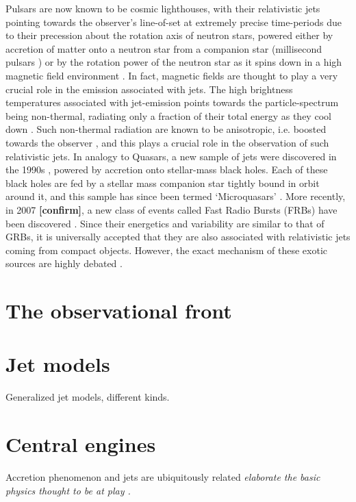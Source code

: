 Pulsars are now known to be cosmic lighthouses, with their relativistic jets pointing towards the observer's line-of-set at extremely precise time-periods due to their precession about the rotation axis of neutron stars, powered either by accretion of matter onto a neutron star from a companion star (millisecond pulsars \R) or by the rotation power of the neutron star as it spins down in a high magnetic field environment \R. In fact, magnetic fields are thought to play a very crucial role in the emission associated with jets. The high brightness temperatures associated with jet-emission points towards the particle-spectrum being non-thermal, radiating only a fraction of their total energy as they cool down \R. Such non-thermal radiation are known to be anisotropic, i.e. boosted towards the observer \Rlots, and this plays a crucial role in the observation of such relativistic jets. In analogy to Quasars, a new sample of jets were discovered in the 1990s \Rlots, powered by accretion onto stellar-mass black holes. Each of these black holes are fed by a stellar mass companion star tightly bound in orbit around it, and this sample has since been termed `Microquasars' \R. More recently, in 2007 \textbf{[confirm]}, a new class of events called Fast Radio Bursts (FRBs) have been discovered \R. Since their energetics and variability are similar to that of GRBs, it is universally accepted that they are also associated with relativistic jets coming from compact objects. However, the exact mechanism of these exotic sources are highly debated \Rlots.

\section{The observational front}

\section{Jet models}
Generalized jet models, different kinds.

\section{Central engines}
Accretion phenomenon and jets are ubiquitously related \emph{elaborate the basic physics thought to be at play \Rlots.}